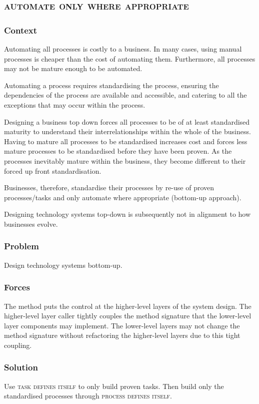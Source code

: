 \documentclass[prodmode]{style/acmlarge}
\begin{document}
\subsection{\textsc{\textbf{automate only where appropriate}}}

\subsubsection*{Context} Automating all processes is costly to a business.  In
many cases, using manual processes is cheaper than the cost of automating them.
 Furthermore, all processes may not be mature enough to be automated.
 
Automating a process requires standardising the process, ensuring the
dependencies of the process are available and accessible, and catering to all the
exceptions that may occur within the process.

Designing a business top down forces all processes to be of at least
standardised maturity to understand their interrelationships within the whole of
the business.  Having to mature all processes to be standardised increases cost
and forces less mature processes to be standardised before they have been
proven.  As the processes inevitably mature within the business, they become
different to their forced up front standardisation.

Businesses, therefore, standardise their processes by re-use of proven
processes/tasks and only automate where appropriate (bottom-up approach).

Designing technology systems top-down is subsequently not in alignment to how
businesses evolve.

\subsubsection*{Problem} Design technology systems bottom-up.

\subsubsection*{Forces} The method puts the control at the higher-level layers
of the system design.  The higher-level layer caller tightly couples the method
signature that the lower-level layer components may implement.  The lower-level
layers may not change the method signature without refactoring the higher-level
layers due to this tight coupling.

\subsubsection*{Solution} Use \textsc{task defines itself} to only build proven
tasks.  Then build only the standardised processes through \textsc{process
defines itself}.
\end{document}
